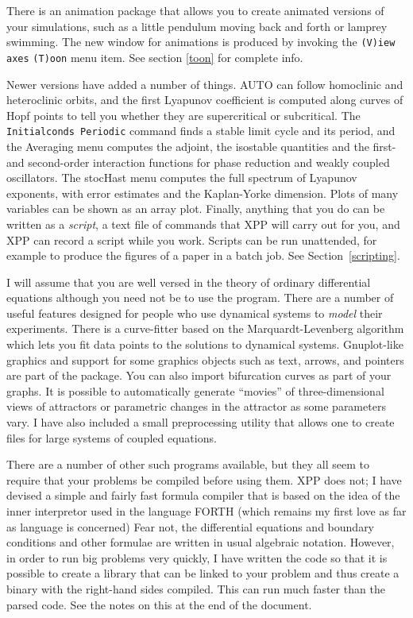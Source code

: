 \documentclass{article}
\begin{document}
There is an animation package that allows you to
create animated versions of your simulations, such as a little
pendulum moving back and forth or lamprey swimming. The new window for
animations is produced by invoking the {\tt (V)iew axes} {\tt (T)oon}
menu item.  See section \ref{toon} for complete info.

Newer versions have added a number of things.  AUTO can follow homoclinic and heteroclinic orbits, and the
first Lyapunov coefficient is computed along curves of Hopf points to tell you whether they are supercritical or
subcritical.  The {\tt Initialconds Periodic} command finds a stable limit cycle and its period, and the
Averaging menu computes the adjoint, the isostable quantities and the first- and second-order interaction
functions for phase reduction and weakly coupled oscillators.  The stocHast menu computes the full spectrum of Lyapunov exponents, with error estimates and the Kaplan-Yorke dimension.  Plots of many variables can be shown as an
array plot.  Finally, anything that you do can be written as a {\em script}, a text file of commands that XPP
will carry out for you, and XPP can record a script while you work.  Scripts can be run
unattended, for example to produce the figures of a paper in a batch job.  See Section~\ref{scripting}.

 
I will assume that you are well versed in the theory of ordinary differential
 equations although you need not be to use the program.  
There are a number of useful features designed for people who use
dynamical systems to {\em model} their experiments.  There is a
curve-fitter based on the Marquardt-Levenberg algorithm which lets you
fit data points to the solutions to dynamical systems.  
Gnuplot-like graphics and
support for some graphics objects such as text, arrows, and
pointers are part of the package. You can also import bifurcation
curves as part of your graphs.
 It is possible to automatically generate ``movies'' of
three-dimensional views of attractors or parametric changes in the
attractor as some parameters vary.    I have
also included a small preprocessing utility that allows one to create
files for large systems of coupled equations. 

There are a number of other such programs available, but they all seem to
 require that your problems be compiled before using them.  XPP does not;
 I have devised a simple and fairly fast formula compiler that is based
 on the idea of the inner interpretor used in the language FORTH (which
 remains my first love as far as language is concerned)  Fear not, the
 differential equations and boundary conditions and other formulae are
 written in usual algebraic notation.  However, in order to run big
problems very quickly, I have written the code so that it is possible
to create a library that can be linked to your problem and thus create
a binary with the right-hand sides compiled.  This can run much faster
than the parsed code.  See the notes on this at the end of the
document. 
\end{document}
